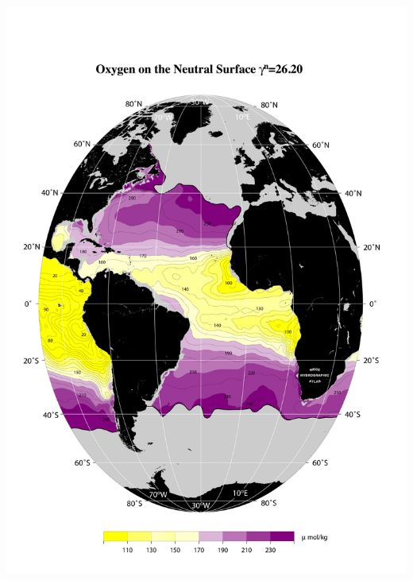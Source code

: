 \documentclass{beamer}
\begin{document}
\begin{frame}[plain,t]
\begin{columns}
\begin{column}{0.5\textwidth}
          \includegraphics[width=\textwidth]{oxygen_isopyc_jpg/gam2620_oxy.jpg}  
      \end{column}
    \end{columns} 
\end{frame}
\end{document}
